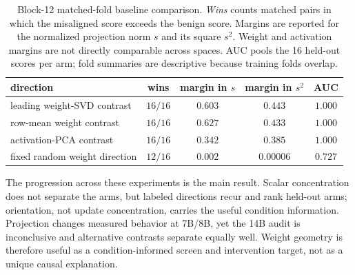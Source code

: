 \begin{table}[!htbp]
\centering
\caption{Block-12 matched-fold baseline comparison. \emph{Wins} counts matched
pairs in which the misaligned score exceeds the benign score. Margins are
reported for the normalized projection norm $s$ and its square $s^2$. Weight
and activation margins are not directly comparable across spaces. AUC pools the 16 held-out scores per arm;
fold summaries are descriptive because training folds overlap.}
\label{tab:baseline-bakeoff}
\small
\begin{tabular}{lcccc}
\toprule
direction & wins & margin in $s$ & margin in $s^2$ & AUC \\
\midrule
leading weight-SVD contrast & $16/16$ & $0.603$ & $0.443$ & $1.000$ \\
row-mean weight contrast & $16/16$ & $0.627$ & $0.433$ & $1.000$ \\
activation-PCA contrast & $16/16$ & $0.342$ & $0.385$ & $1.000$ \\
fixed random weight direction & $12/16$ & $0.002$ & $0.00006$ & $0.727$ \\
\bottomrule
\end{tabular}
\end{table}
\FloatBarrier

The progression across these experiments is the main result. Scalar
concentration does not separate the arms, but labeled directions recur and rank
held-out arms; orientation, not update concentration, carries the useful
condition information. Projection changes measured behavior at 7B/8B, yet the
14B audit is inconclusive and alternative contrasts separate equally well.
Weight geometry is therefore useful as a condition-informed screen and
intervention target, not as a unique causal explanation.
